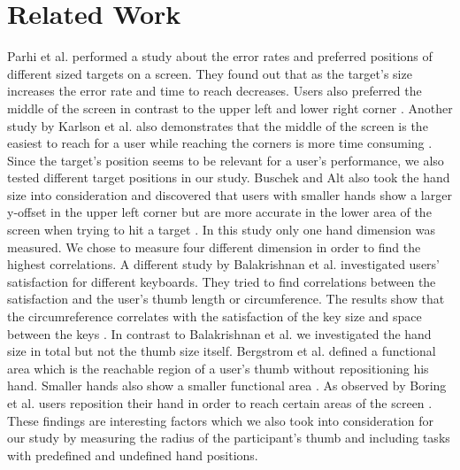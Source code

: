 \documentclass{sigchi}
\begin{document}
\section{Related Work}
Parhi et al. performed a study about the error rates and preferred positions of different sized targets on a screen. They found out that as the target's size increases the error rate and time to reach decreases. Users also preferred the middle of the screen in contrast to the upper left and lower right corner \cite{parhi2006target}. Another study by Karlson et al. also demonstrates that the middle of the screen is the easiest to reach for a user while reaching the corners is more time consuming \cite{karlson2006studies}. Since the target's position seems to be relevant for a user's performance, we also tested different target positions in our study. Buschek and Alt also took the hand size into consideration and discovered that users with smaller hands show a larger y-offset in the upper left corner but are more accurate in the lower area of the screen when trying to hit a target \cite{buschek2015touchml}. In this study only one hand dimension was measured. We chose to measure four different dimension in order to find the highest correlations. A different study by Balakrishnan et al. investigated users' satisfaction for different keyboards. They tried to find correlations between the satisfaction and the user's thumb length or circumference. The results show that the circumreference correlates with the satisfaction of the key size and space between the keys \cite{balakrishnan2008study}. In contrast to Balakrishnan et al. we investigated the hand size in total but not the thumb size itself. Bergstrom et al. defined a functional area which is the reachable region of a user's thumb without repositioning his hand. Smaller hands also show a smaller functional area \cite{bergstrom2014modeling}. As observed by Boring et al. users reposition their hand in order to reach certain areas of the screen \cite{boring2012fat}. These findings are interesting factors which we also took into consideration for our study by measuring the radius of the participant's thumb and including tasks with predefined and undefined hand positions.
\end{document}
